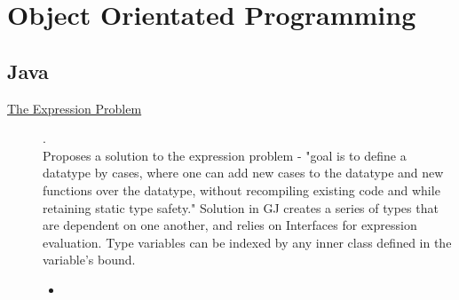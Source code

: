 \chapter {Object Orientated Programming}

\section{Java}

\begin{description}
  \item[\href{http://homepages.inf.ed.ac.uk/wadler/papers/expression/expression.txt}{The Expression Problem}] {\cite{wadler1998expression}.
    \\ Proposes a solution to the expression problem - "goal is to define a datatype by cases, where one can add new cases to the datatype and new functions over the datatype, without recompiling existing code and while retaining static type safety." Solution in GJ creates a series of types that are dependent on one another, and relies on Interfaces for expression evaluation. Type variables can be indexed by any inner class defined in the variable's bound.
    \begin{itemize}
      \item {}
    \end{itemize}}
\end{description}
